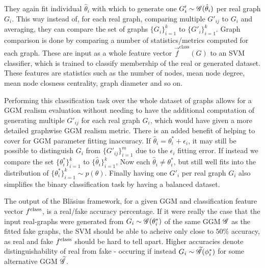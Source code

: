 They again fit individual $\hat{\theta}_i$ with which to generate one $G'_i \sim \mathscr{G}(\hat{\theta}_i)$ per real graph $G_i$. This way instead of, for each real graph, comparing multiple $G'_{ij}$ to $G_i$ and averaging, they can compare the set of graphs $\{G_i\}_{i=1}^k$ to $\{G'_i\}_{i=1}^k$. Graph comparison is done by comparing a number of statistics/metrics computed for each graph. These are input as a whole feature vector $\vec{f}^\mathrm{class}(G)$ to an SVM classifier, which is trained to classify membership of the real or generated dataset. These features are statistics such as the number of nodes, mean node degree, mean node closness centrality, graph diameter and so on.


Performing this classification task over the whole dataset of graphs allows for a GGM realism evaluation without needing to have the additional computation of generating multiple $G'_{ij}$ for each real graph $G_i$, which would have given a more detailed graphwise GGM realism metric. There is an added benefit of helping to cover for GGM parameter fitting inaccuracy. If $\hat{\theta}_i = \theta^*_i + \epsilon_i$, it may still be possible to distinguish $G_i$ from $\{G'_{ij}\}_{i=1}^m$ due to the $\epsilon_i$ fitting error. If instead we compare the set $\{\theta^*_i\}_{i=1}^k$ to $\{\hat{\theta}_i\}_{i=1}^k$, Now each $\hat{\theta}_i \neq \theta^*_i$, but still well fits into the distribution of $\{\theta^*_i\}_{i=1}^k \sim p(\theta)$. Finally having one $G'_i$ per real graph $G_i$ also simplifies the binary classification task by having a balanced dataset.



The output of the Bl{\"a}sius framework, for a given GGM and classification feature vector $f^{\mathrm{class}}$, is a real/fake accuracy percentage. If it were really the case that the input real-graphs were generated from $G_i \sim \mathscr{G}(\theta^*_i)$ of the same GGM $\mathscr{G}$ as the fitted fake graphs, the SVM should be able to acheive only close to $50\%$ accuracy, as real and fake $f^{\mathrm{class}}$ should be hard to tell apart. Higher accuracies denote distinguishability of real from fake - occuring if instead $G_i \sim \widetilde{\mathscr{G}}(\phi^*_i)$ for some alternative GGM $\widetilde{\mathscr{G}}$.


